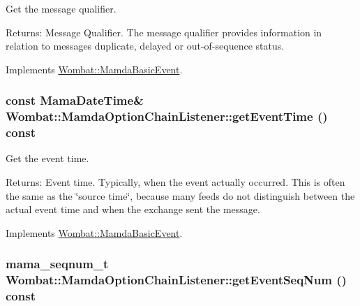 Get the message qualifier. 

\begin{Desc}
\item[Returns:]Message Qualifier. The message qualifier provides information in relation to messages duplicate, delayed or out-of-sequence status. \end{Desc}


Implements \hyperlink{classWombat_1_1MamdaBasicEvent_675ce8f1de581548426335423d6b3864}{Wombat::Mamda\-Basic\-Event}.\hypertarget{classWombat_1_1MamdaOptionChainListener_5cf26056ce6135a00627d5efea861dfc}{
\subsubsection[getEventTime]{\setlength{\rightskip}{0pt plus 5cm}const Mama\-Date\-Time\& Wombat::Mamda\-Option\-Chain\-Listener::get\-Event\-Time () const}}
\label{classWombat_1_1MamdaOptionChainListener_5cf26056ce6135a00627d5efea861dfc}


Get the event time. 

\begin{Desc}
\item[Returns:]Event time. Typically, when the event actually occurred. This is often the same as the \char`\"{}source time\char`\"{}, because many feeds do not distinguish between the actual event time and when the exchange sent the message. \end{Desc}


Implements \hyperlink{classWombat_1_1MamdaBasicEvent_7285491c2c657207a64b1b0449c0339b}{Wombat::Mamda\-Basic\-Event}.\hypertarget{classWombat_1_1MamdaOptionChainListener_936a15ecd68edbee310aba01fc7ae7b5}{
\subsubsection[getEventSeqNum]{\setlength{\rightskip}{0pt plus 5cm}mama\_\-seqnum\_\-t Wombat::Mamda\-Option\-Chain\-Listener::get\-Event\-Seq\-Num () const}}
\label{classWombat_1_1MamdaOptionChainListener_936a15ecd68edbee310aba01fc7ae7b5}


